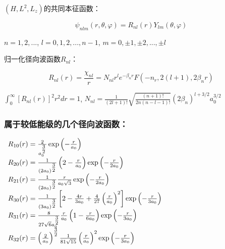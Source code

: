 $(H, L^2, L_z)$的共同本征函数：

\begin{equation}
\psi _{nlm} \left( {r,\theta ,\varphi } \right) = R_{nl} \left( r \right)Y_{lm} \left( {\theta ,\varphi } \right)
\end{equation}

$n = 1,2,...$, $l = 0,1,2,...,n - 1$, $m = 0, \pm 1, \pm 2,..., \pm l$

归一化径向波函数$R_{nl}$：

\begin{equation}
R_{nl} (r) = \frac{{\chi _{nl} }}{r} = N_{nl} r^l e^{ - \beta _n r} F\left( { - n_r ,2(l + 1),2\beta _n r} \right)
\end{equation}

$\int_0^\infty  {\left[ {R_{nl} (r)} \right]^2 r^2 dr}  = 1$, $N_{nl}  = \frac{1}{{\left( {2l + 1} \right)!}}\sqrt {\frac{{(n + 1)!}}{{2n(n - l - 1)!}}} \left( {2\beta _n } \right)^{l + 3/2} a_0^{3/2} $



\subsubsection*{属于较低能级的几个径向波函数：}

$\begin{array}{l}
 R_{10} (r) = \frac{2}{{a_0^{{\textstyle{3 \over 2}}} }}\exp \left( { - \frac{r}{{a_0 }}} \right) \\
 R_{20} (r) = \frac{1}{{\left( {2a_0 } \right)^{{\textstyle{3 \over 2}}} }}\left( {2 - \frac{r}{{a_0 }}} \right)\exp \left( { - \frac{r}{{2a_0 }}} \right) \\
 R_{21} (r) = \frac{1}{{\left( {2a_0 } \right)^{{\textstyle{3 \over 2}}} }}\frac{r}{{a_0 \sqrt 3 }}\exp \left( { - \frac{r}{{2a_0 }}} \right) \\
 R{}_{30}(r) = \frac{1}{{\left( {3a_0 } \right)^{{\textstyle{3 \over 2}}} }}\left[ {2 - \frac{{4r}}{{3a_0 }} + \frac{4}{{27}}\left( {\frac{r}{{a_0 }}} \right)^2 } \right]\exp \left( { - \frac{r}{{3a_0 }}} \right) \\
 R_{31} (r) = \frac{8}{{27\sqrt 6 a_0^{{\textstyle{3 \over 2}}} }}\frac{r}{{a_0 }}\left( {1 - \frac{r}{{6a_0 }}} \right)\exp \left( { - \frac{r}{{3a_0 }}} \right) \\
 R_{32} (r) = \left( {\frac{2}{{a_0 }}} \right)^{{\textstyle{3 \over 2}}} \frac{1}{{81\sqrt {15} }}\left( {\frac{r}{{a_0 }}} \right)^2 \exp \left( { - \frac{r}{{3a_0 }}} \right) \\
 \end{array}$



